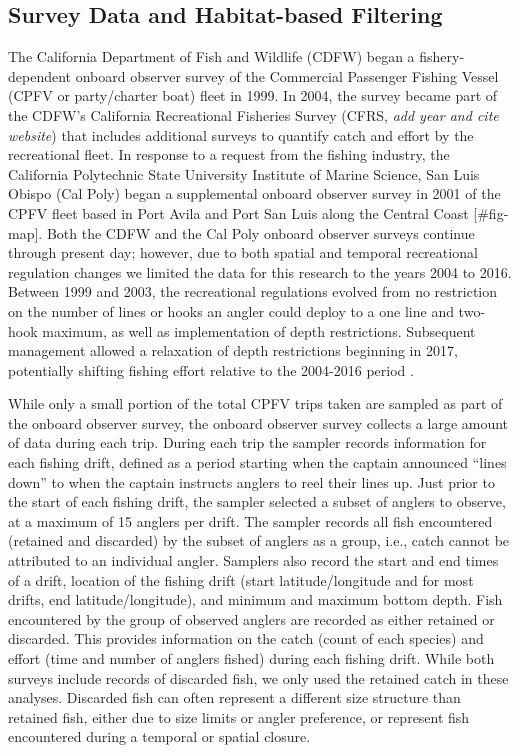\documentclass[
  12pt,
  authoryear,
  preprint,
  3p]{elsarticle}
\begin{document}
\hypertarget{survey-data-and-habitat-based-filtering}{%
\subsection{Survey Data and Habitat-based
Filtering}\label{survey-data-and-habitat-based-filtering}}

The California Department of Fish and Wildlife (CDFW) began a
fishery-dependent onboard observer survey of the Commercial Passenger
Fishing Vessel (CPFV or party/charter boat) fleet in 1999. In 2004, the
survey became part of the CDFW's California Recreational Fisheries
Survey (CFRS, \emph{add year and cite website}) that includes additional
surveys to quantify catch and effort by the recreational fleet. In
response to a request from the fishing industry, the California
Polytechnic State University Institute of Marine Science, San Luis
Obispo (Cal Poly) began a supplemental onboard observer survey in 2001
of the CPFV fleet based in Port Avila and Port San Luis along the
Central Coast {[}\#fig-map{]}. Both the CDFW and the Cal Poly onboard
observer surveys continue through present day; however, due to both
spatial and temporal recreational regulation changes we limited the data
for this research to the years 2004 to 2016. Between 1999 and 2003, the
recreational regulations evolved from no restriction on the number of
lines or hooks an angler could deploy to a one line and two-hook
maximum, as well as implementation of depth restrictions. Subsequent
management allowed a relaxation of depth restrictions beginning in 2017,
potentially shifting fishing effort relative to the 2004-2016 period
\citep{Monk:2021:SVR}.

While only a small portion of the total CPFV trips taken are sampled as
part of the onboard observer survey, the onboard observer survey
collects a large amount of data during each trip. During each trip the
sampler records information for each fishing drift, defined as a period
starting when the captain announced ``lines down'' to when the captain
instructs anglers to reel their lines up. Just prior to the start of
each fishing drift, the sampler selected a subset of anglers to observe,
at a maximum of 15 anglers per drift. The sampler records all fish
encountered (retained and discarded) by the subset of anglers as a
group, i.e., catch cannot be attributed to an individual angler.
Samplers also record the start and end times of a drift, location of the
fishing drift (start latitude/longitude and for most drifts, end
latitude/longitude), and minimum and maximum bottom depth. Fish
encountered by the group of observed anglers are recorded as either
retained or discarded. This provides information on the catch (count of
each species) and effort (time and number of anglers fished) during each
fishing drift. While both surveys include records of discarded fish, we
only used the retained catch in these analyses. Discarded fish can often
represent a different size structure than retained fish, either due to
size limits or angler preference, or represent fish encountered during a
temporal or spatial closure.
\end{document}
